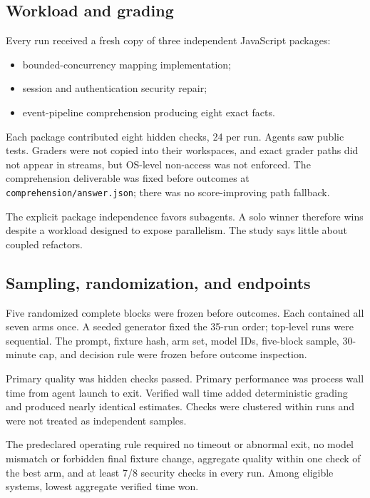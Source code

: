 \documentclass[11pt,oneside]{article}
\begin{document}
\subsection{Workload and grading}

Every run received a fresh copy of three independent JavaScript packages:

\begin{itemize}
  \item bounded-concurrency mapping implementation;
  \item session and authentication security repair;
  \item event-pipeline comprehension producing eight exact facts.
\end{itemize}

Each package contributed eight hidden checks, 24 per run. Agents saw public
tests. Graders were not copied into their workspaces, and exact grader paths did
not appear in streams, but OS-level non-access was not enforced. The
comprehension deliverable was fixed before outcomes at
\texttt{comprehension/answer.json}; there was no score-improving path fallback.

The explicit package independence favors subagents. A solo winner therefore
wins despite a workload designed to expose parallelism. The study says little
about coupled refactors.

\subsection{Sampling, randomization, and endpoints}

Five randomized complete blocks were frozen before outcomes. Each contained all
seven arms once. A seeded generator fixed the 35-run order; top-level runs were
sequential. The prompt, fixture hash, arm set, model IDs, five-block sample,
30-minute cap, and decision rule were frozen before outcome inspection.

Primary quality was hidden checks passed. Primary performance was process wall
time from agent launch to exit. Verified wall time added deterministic grading
and produced nearly identical estimates. Checks were clustered within runs and
were not treated as independent samples.

  The predeclared operating rule required no timeout or abnormal exit, no model
mismatch or forbidden final fixture change, aggregate quality within one check
of the best arm, and at least 7/8 security checks in every run. Among eligible
systems, lowest aggregate verified time won.
\end{document}
